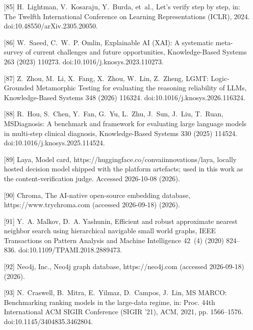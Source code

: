 \documentclass[11pt]{article}
\begin{document}
[85] 
H.~Lightman, V.~Kosaraju, Y.~Burda, et~al., Let's verify step by step, in: The
  Twelfth International Conference on Learning Representations (ICLR), 2024.
  doi:10.48550/arXiv.2305.20050.



[86] 
W.~Saeed, C.~W.~P. Omlin, {Explainable AI (XAI): A systematic meta-survey of
  current challenges and future opportunities}, Knowledge-Based Systems 263
  (2023) 110273.
  doi:10.1016/j.knosys.2023.110273.



[87] 
Z.~Zhou, M.~Li, X.~Fang, X.~Zhou, W.~Lin, Z.~Zheng, {LGMT: Logic-Grounded
  Metamorphic Testing for evaluating the reasoning reliability of LLMs},
  Knowledge-Based Systems 348 (2026) 116324.
  doi:10.1016/j.knosys.2026.116324.



[88] 
R.~Hou, S.~Chen, Y.~Fan, G.~Yu, L.~Zhu, J.~Sun, J.~Liu, T.~Ruan, {MSDiagnosis:
  A benchmark and framework for evaluating large language models in multi-step
  clinical diagnosis}, Knowledge-Based Systems 330 (2025) 114524.
  doi:10.1016/j.knosys.2025.114524.



[89] 
Laya, Model card, https://huggingface.co/convaiinnovations/laya, locally
  hosted decision model shipped with the platform artefacts; used in this work
  as the content-verification judge. Accessed 2026-10-08 (2026).



[90] 
{Chroma}, The {AI}-native open-source embedding database,
  https://www.trychroma.com (accessed 2026-09-18) (2026).



[91] 
Y.~A. Malkov, D.~A. Yashunin, Efficient and robust approximate nearest neighbor
  search using hierarchical navigable small world graphs, IEEE Transactions on
  Pattern Analysis and Machine Intelligence 42~(4) (2020) 824--836.
  doi:10.1109/TPAMI.2018.2889473.



[92] 
{Neo4j, Inc.}, Neo4j graph database, https://neo4j.com (accessed
  2026-09-18) (2026).



[93] 
N.~Craswell, B.~Mitra, E.~Yilmaz, D.~Campos, J.~Lin, {MS MARCO}: Benchmarking
  ranking models in the large-data regime, in: Proc. 44th International ACM
  SIGIR Conference (SIGIR '21), ACM, 2021, pp. 1566--1576.
  doi:10.1145/3404835.3462804.
\end{document}
